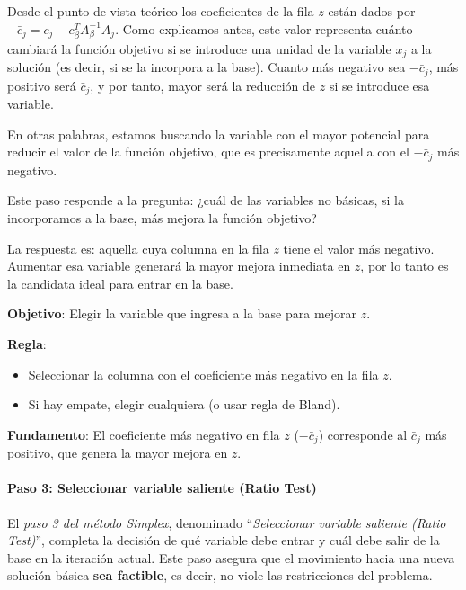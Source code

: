 Desde el punto de vista teórico los coeficientes de la fila \(z\) están dados por \(-\bar{c}_j = c_j - c_\beta^T A_\beta^{-1} A_j\). Como explicamos antes, este valor representa cuánto cambiará la función objetivo si se introduce una unidad de la variable \(x_j\) a la solución (es decir, si se la incorpora a la base). Cuanto más negativo sea \(-\bar{c}_j\), más positivo será \(\bar{c}_j\), y por tanto, mayor será la reducción de \(z\) si se introduce esa variable.

En otras palabras, estamos buscando la variable con el mayor potencial para reducir el valor de la función objetivo, que es precisamente aquella con el \(-\bar{c}_j\) más negativo.

Este paso responde a la pregunta: ¿cuál de las variables no básicas, si la incorporamos a la base, más mejora la función objetivo?

La respuesta es: aquella cuya columna en la fila \(z\) tiene el valor más negativo. Aumentar esa variable generará la mayor mejora inmediata en \(z\), por lo tanto es la candidata ideal para entrar en la base.

\begin{tcolorbox}[title=Resumen del paso 2]
  \noindent \textbf{Objetivo}: Elegir la variable que ingresa a la base para mejorar \(z\).
  
  \noindent \textbf{Regla}:
  \begin{itemize}
    \item Seleccionar la columna con el coeficiente más negativo en la fila \(z\).
    \item Si hay empate, elegir cualquiera (o usar regla de Bland).
  \end{itemize}
  
  \noindent \textbf{Fundamento}: El coeficiente más negativo en fila \(z\) (\(-\bar{c}_j\)) corresponde al \(\bar{c}_j\) más positivo, que genera la mayor mejora en \(z\).
\end{tcolorbox}

\paragraph{Paso 3: Seleccionar variable saliente (Ratio Test)}

El \textit{paso 3 del método Simplex}, denominado ``\textit{Seleccionar variable saliente (Ratio Test)}'', completa la decisión de qué variable debe entrar y cuál debe salir de la base en la iteración actual. Este paso asegura que el movimiento hacia una nueva solución básica \textbf{sea factible}, es decir, no viole las restricciones del problema.

